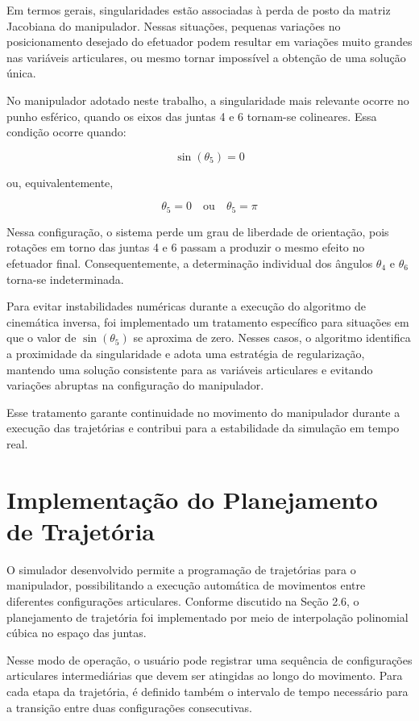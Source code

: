 Em termos gerais, singularidades estão associadas à perda de posto da matriz Jacobiana do manipulador. Nessas situações, pequenas variações no posicionamento desejado do efetuador podem resultar em variações muito grandes nas variáveis articulares, ou mesmo tornar impossível a obtenção de uma solução única.

No manipulador adotado neste trabalho, a singularidade mais relevante ocorre no punho esférico, quando os eixos das juntas 4 e 6 tornam-se colineares. Essa condição ocorre quando:

\begin{equation}
\sin(\theta_5) = 0
\end{equation}

ou, equivalentemente,

\begin{equation}
\theta_5 = 0 \quad \text{ou} \quad \theta_5 = \pi
\end{equation}

Nessa configuração, o sistema perde um grau de liberdade de orientação, pois rotações em torno das juntas 4 e 6 passam a produzir o mesmo efeito no efetuador final. Consequentemente, a determinação individual dos ângulos $\theta_4$ e $\theta_6$ torna-se indeterminada.

Para evitar instabilidades numéricas durante a execução do algoritmo de cinemática inversa, foi implementado um tratamento específico para situações em que o valor de $\sin(\theta_5)$ se aproxima de zero. Nesses casos, o algoritmo identifica a proximidade da singularidade e adota uma estratégia de regularização, mantendo uma solução consistente para as variáveis articulares e evitando variações abruptas na configuração do manipulador.

Esse tratamento garante continuidade no movimento do manipulador durante a execução das trajetórias e contribui para a estabilidade da simulação em tempo real.
\section{Implementação do Planejamento de Trajetória}

O simulador desenvolvido permite a programação de trajetórias para o manipulador, possibilitando a execução automática de movimentos entre diferentes configurações articulares. Conforme discutido na Seção 2.6, o planejamento de trajetória foi implementado por meio de interpolação polinomial cúbica no espaço das juntas.

Nesse modo de operação, o usuário pode registrar uma sequência de configurações articulares intermediárias que devem ser atingidas ao longo do movimento. Para cada etapa da trajetória, é definido também o intervalo de tempo necessário para a transição entre duas configurações consecutivas.

